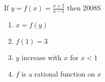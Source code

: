 \iffalse
\title{10. Functions}
\author{Mohit - EE24BTECH11041}
\section{mcq-multiple}
\fi
\item If $y=f(x)=\frac{x+2}{x-1}$ then
\hfill{2008S}
\begin{enumerate}
    \item $x=f(y)$
    \item $f(1)=3$
    \item $y$ increase with $x$ for $x<1$
    \item $f$ is a rational function on $x$
\end{enumerate}
